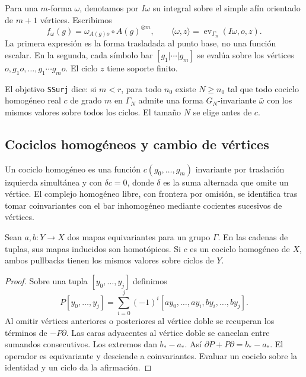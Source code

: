 Para una $m$-forma $\omega$, denotamos por $I\omega$ su integral sobre el simple afín orientado de $m+1$ vértices. Escribimos
\begin{equation}
 f_\omega(g)=\omega_{A(g)o}\circ A(g)^{\otimes m},\qquad
 \langle\omega,z\rangle=\operatorname{ev}_{\Gamma_n}(I\omega,o,z).
 \label{eq:sh-marco}
\end{equation}
La primera expresión es la forma trasladada al punto base, no una función escalar. En la segunda, cada símbolo bar $[g_1|\cdots|g_m]$ se evalúa sobre los vértices $o,g_1o,\ldots,g_1\cdots g_mo$. El ciclo $z$ tiene soporte finito.

El objetivo \texttt{SSurj} dice: si $m<r$, para todo $n_0$ existe $N\ge n_0$ tal que todo cociclo homogéneo real $c$ de grado $m$ en $\Gamma_N$ admite una forma $G_N$-invariante $\bar\omega$ con los mismos valores sobre todos los ciclos. El tamaño $N$ se elige antes de $c$.

\subsection{Cociclos homogéneos y cambio de vértices}

Un cociclo homogéneo es una función $c(g_0,\ldots,g_m)$ invariante por traslación izquierda simultánea y con $\delta c=0$, donde $\delta$ es la suma alternada que omite un vértice. El complejo homogéneo libre, con frontera por omisión, se identifica tras tomar coinvariantes con el bar inhomogéneo mediante cocientes sucesivos de vértices.

\begin{lema}
\label{lem:sh-prisma}
Sean $a,b:Y\to X$ dos mapas equivariantes para un grupo $\Gamma$. En las cadenas de tuplas, sus mapas inducidos son homotópicos. Si $c$ es un cociclo homogéneo de $X$, ambos pullbacks tienen los mismos valores sobre ciclos de $Y$.
\end{lema}
\begin{proof}
Sobre una tupla $[y_0,\ldots,y_j]$ definimos
\begin{equation}
 P[y_0,\ldots,y_j]=\sum_{i=0}^{j}(-1)^i
 [ay_0,\ldots,ay_i,by_i,\ldots,by_j].
 \label{eq:sh-prisma}
\end{equation}
Al omitir vértices anteriores o posteriores al vértice doble se recuperan los términos de $-P\partial$. Las caras adyacentes al vértice doble se cancelan entre sumandos consecutivos. Los extremos dan $b_*-a_*$. Así $\partial P+P\partial=b_*-a_*$. El operador es equivariante y desciende a coinvariantes. Evaluar un cociclo sobre la identidad y un ciclo da la afirmación.
\end{proof}

